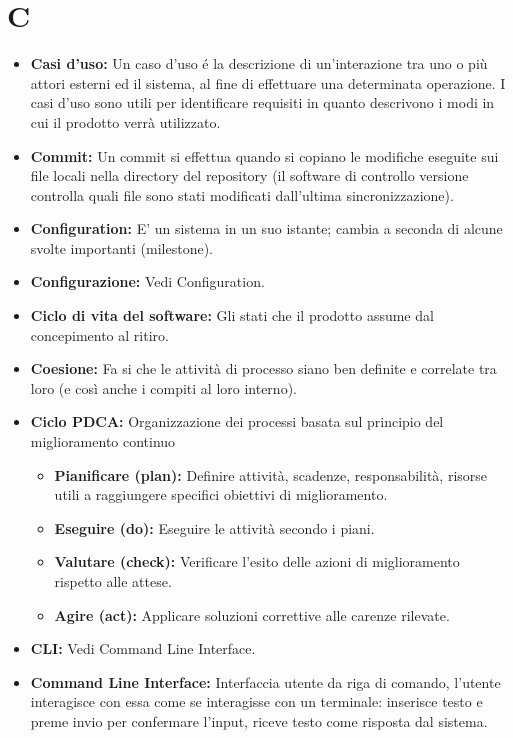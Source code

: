 \documentclass[a4paper]{article}
\begin{document}
	\section{C}
		\begin{itemize}
			\item \textbf{Casi d'uso:} Un caso d'uso é la descrizione di un'interazione tra uno o più attori esterni ed il sistema, al
			fine di effettuare una determinata operazione. I casi d'uso sono utili per identificare requisiti in quanto descrivono
			i modi in cui il prodotto verrà utilizzato.
			\item \textbf{Commit:} Un commit si effettua quando si copiano le modifiche eseguite sui file locali nella directory del 
			repository  (il software di controllo versione controlla quali file sono stati modificati dall’ultima sincronizzazione).
			\item \textbf{Configuration:} E' un sistema in un suo istante; cambia a seconda di alcune svolte importanti (milestone).
			\item \textbf{Configurazione:} Vedi Configuration.
			\item \textbf{Ciclo di vita del software:} Gli stati che il prodotto assume dal concepimento al ritiro.
			\item \textbf{Coesione:} Fa si che le attività di processo siano ben definite e correlate tra loro (e così anche i 
			compiti al loro interno).
			\item \textbf{Ciclo PDCA:} Organizzazione dei processi basata sul principio del miglioramento continuo
			\begin{itemize}
				\item \textbf{Pianificare (plan):} Definire attività, scadenze, responsabilità, risorse utili a raggiungere 
				specifici obiettivi di miglioramento.
				\item \textbf{Eseguire (do):} Eseguire le attività secondo i piani.
				\item \textbf{Valutare (check):} Verificare l’esito delle azioni di miglioramento rispetto alle attese.
				\item \textbf{Agire (act):} Applicare soluzioni correttive alle carenze rilevate.
			\end{itemize}
			\item \textbf{CLI:} Vedi Command Line Interface.
			\item \textbf{Command Line Interface:} Interfaccia utente da riga di comando, l'utente interagisce con essa come se interagisse con un terminale: inserisce testo e preme invio per confermare l'input, riceve testo come risposta dal sistema.
		\end{itemize}
		
\end{document}
